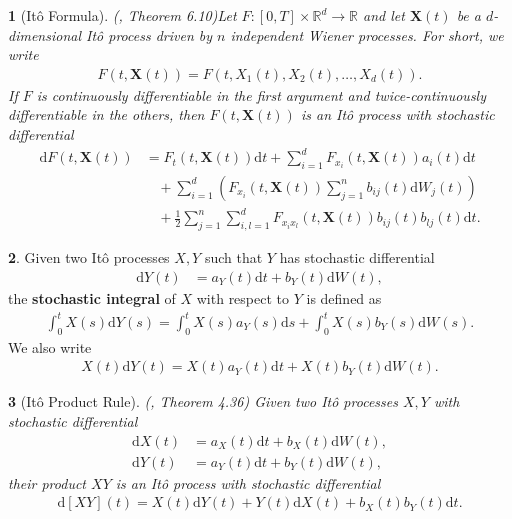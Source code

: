 \documentclass[english]{article}
\numberwithin{equation}{section}
\numberwithin{figure}{section}
\theoremstyle{bolddescit}
\newtheorem{theorem}{\protect\theoremname}[section]
\theoremstyle{definition}
\newtheorem{definition}[theorem]{\protect\definitionname}
\theoremstyle{definition}
\theoremstyle{plain}
\theoremstyle{plain}
\theoremstyle{bolddesc}
\theoremstyle{plain}
\theoremstyle{remark}
\providecommand{\definitionname}{Definition}
\providecommand{\theoremname}{Theorem}
\begin{document}
\begin{theorem}[It\^o Formula]
  (\cite{capinski_blackscholes_2012}, Theorem 6.10)\label{thm:ito-formula}
  Let $F : [0,T] \times \mathbb{R}^d \to \mathbb{R}$ and let $\mathbf{X}(t)$ be a $d$-dimensional It\^o process driven by $n$ independent Wiener processes. For short, we write
  \begin{align*}
    F(t,\mathbf{X}(t)) = F(t,X_1(t),X_2(t),\ldots,X_d(t)).
  \end{align*}
  If $F$ is continuously differentiable in the first argument and twice-continuously differentiable in the others, then $F(t,\mathbf{X}(t))$ is an It\^o process with stochastic differential
  \begin{align*}
    \mathrm{d}F(t,\mathbf{X}(t))
    &= F_t(t,\mathbf{X}(t)) \mathrm{d}t + \sum_{i=1}^d F_{x_i}(t,\mathbf{X}(t)) a_i(t) \mathrm{d}t\\
    &\ \ \ \ + \sum_{i=1}^d \left(F_{x_i}(t,\mathbf{X}(t)) \sum_{j=1}^n b_{ij}(t) \mathrm{d}W_j(t) \right)\\
    &\ \ \ \ + \frac{1}{2} \sum_{j=1}^n \sum_{i,l=1}^d F_{x_i x_l}(t,\mathbf{X}(t)) b_{ij}(t)b_{lj}(t) \mathrm{d}t.
  \end{align*}
\end{theorem}

\begin{definition}
  Given two It\^o processes $X, Y$ such that $Y$ has stochastic differential
  \begin{align*}
    \mathrm{d}Y(t) &= a_Y(t) \mathrm{d}t + b_Y(t) \mathrm{d}W(t),
  \end{align*}
  the \textbf{stochastic integral} of $X$ with respect to $Y$ is defined as
  \begin{align*}
    \int_0^t X(s) \mathrm{d}Y(s) = \int_0^t X(s) a_Y(s) \mathrm{d}s + \int_0^t X(s) b_Y(s) \mathrm{d}W(s).
  \end{align*}
  We also write
  \begin{align*}
    X(t) \mathrm{d}Y(t) = X(t) a_Y(t) \mathrm{d}t + X(t) b_Y(t) \mathrm{d}W(t).
  \end{align*}
\end{definition}

\begin{theorem}[It\^o Product Rule]\label{thm:ito-product-rule}
  (\cite{capinski_stochastic_2012}, Theorem 4.36)
  Given two It\^o processes $X, Y$ with stochastic differential
  \begin{align*}
    \mathrm{d}X(t) &= a_X(t) \mathrm{d}t + b_X(t) \mathrm{d}W(t),\\
    \mathrm{d}Y(t) &= a_Y(t) \mathrm{d}t + b_Y(t) \mathrm{d}W(t),
  \end{align*}
  their product $XY$ is an It\^o process with stochastic differential
  \begin{align*}
    \mathrm{d}[XY](t) = X(t) \mathrm{d}Y(t) + Y(t) \mathrm{d}X(t) + b_X(t) b_Y(t) \mathrm{d}t.
  \end{align*}
\end{theorem}
\end{document}
